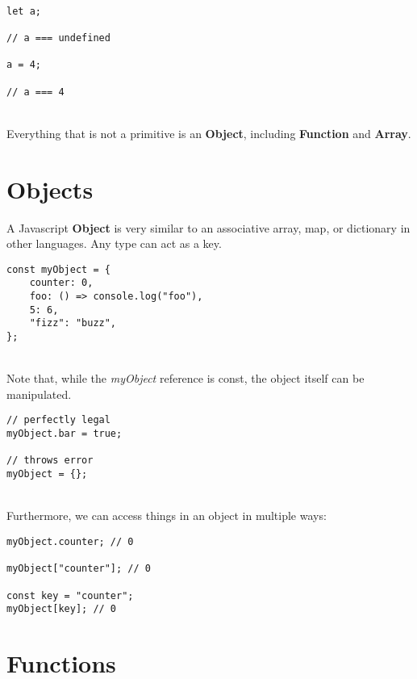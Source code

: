 \documentclass{article}
\begin{document}
\begin{lstlisting}

let a;

// a === undefined

a = 4;

// a === 4

\end{lstlisting}

\noindent
\\
Everything that is not a primitive is an \textbf{Object}, including \textbf{Function} and \textbf{Array}.

\section{Objects}

A Javascript \textbf{Object} is very similar to an associative array, map, or dictionary in other languages. Any type can act as a key.

\begin{lstlisting}
const myObject = {
	counter: 0,
	foo: () => console.log("foo"),
	5: 6,
	"fizz": "buzz",
};
\end{lstlisting}

\noindent
\\
Note that, while the \textit{myObject} reference is const, the object itself can be manipulated.

\begin{lstlisting}
// perfectly legal
myObject.bar = true;

// throws error
myObject = {};
\end{lstlisting}

\noindent
\\
Furthermore, we can access things in an object in multiple ways:

\begin{lstlisting}
myObject.counter; // 0

myObject["counter"]; // 0

const key = "counter";
myObject[key]; // 0
\end{lstlisting}

\section{Functions}
\end{document}
